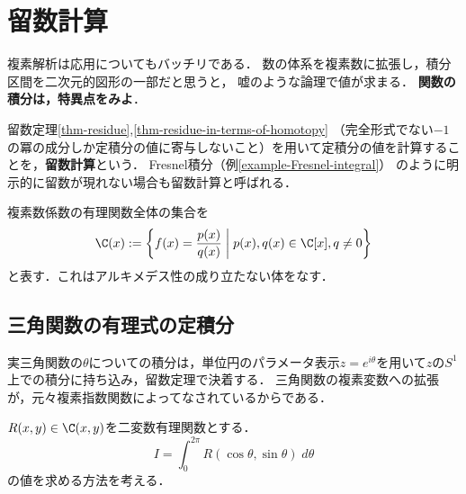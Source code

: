 \documentclass[uplatex, dvipdfmx]{jsreport}
\begin{document}
\section{留数計算}

\begin{tcolorbox}[colframe=ForestGreen, colback=ForestGreen!10!white, breakable ,colbacktitle=ForestGreen!40!white, coltitle=black,fonttitle=\bfseries\sffamily,
    title=複素数の世界を縦横無尽に駆け回る積分計算]
    複素解析は応用についてもバッチリである．
    数の体系を複素数に拡張し，積分区間を二次元的図形の一部だと思うと，
    嘘のような論理で値が求まる．
    \textbf{関数の積分は，特異点をみよ}．
\end{tcolorbox}

\begin{definition}
    留数定理\ref{thm-residue},\ref{thm-residue-in-terms-of-homotopy}
    （完全形式でない$-1$の冪の成分しか定積分の値に寄与しないこと）を用いて定積分の値を計算することを，\textbf{留数計算}という．
    Fresnel積分（例\ref{example-Fresnel-integral}）
    のように明示的に留数が現れない場合も留数計算と呼ばれる．
\end{definition}

\begin{definition}
    複素数係数の有理関数全体の集合を
    \[\C(x):=\left\{f(x)=\frac{p(x)}{q(x)}\;\middle|\;p(x),q(x)\in\C[x],q\ne 0\right\}\]
    と表す．これはアルキメデス性の成り立たない体をなす．
\end{definition}

\subsection{三角関数の有理式の定積分}

\begin{tcolorbox}[colframe=ForestGreen, colback=ForestGreen!10!white, breakable,
    title=三角関数は単位円周上での積分]
    実三角関数の$\theta$についての積分は，単位円のパラメータ表示$z=e^{i\theta}$を用いて$z$の$S^1$上での積分に持ち込み，留数定理で決着する．
    三角関数の複素変数への拡張が，元々複素指数関数によってなされているからである．
\end{tcolorbox}

\begin{screen}
    $R(x,y)\in\C(x,y)$を二変数有理関数とする．
    \[I=\int^{2\pi}_0R(\cos\theta,\sin\theta)\;d\theta\]
    の値を求める方法を考える．
\end{screen}
\end{document}
